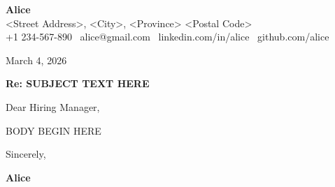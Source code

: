 \documentclass[11pt, letterpaper]{article}
\begin{document}
\begin{center}
  {\LARGE \textbf{Alice}} \\[4pt]
  <Street Address>, <City>, <Province> <Postal Code> \\[2pt]
  +1 234-567-890 \textbar\ alice@gmail.com \textbar\
  linkedin.com/in/alice \textbar\ github.com/alice
\end{center}

\vspace{14pt}

\vspace{14pt}

March 4, 2026

\vspace{14pt}




\textbf{Re:\enspace
SUBJECT TEXT HERE
}


\vspace{6pt}

Dear Hiring Manager,

BODY BEGIN HERE

Sincerely,

\vspace{24pt}

\textbf{Alice}
\end{document}
